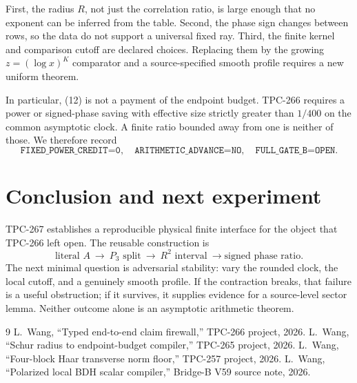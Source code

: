 \documentclass[11pt]{article}
\begin{document}
First, the radius \(R\), not just the correlation ratio, is large enough that
no exponent can be inferred from the table.  Second, the phase sign changes
between rows, so the data do not support a universal fixed ray.  Third, the
finite kernel and comparison cutoff are declared choices.  Replacing them by
the growing \(z=(\log x)^K\) comparator and a source-specified smooth profile
requires a new uniform theorem.

In particular, (12) is not a payment of the endpoint budget.  TPC-266
requires a power or signed-phase saving with effective size strictly greater
than \(1/400\) on the common asymptotic clock.  A finite ratio bounded away
from one is neither of those.  We therefore record
\[
 \texttt{FIXED\_POWER\_CREDIT=0},\quad
 \texttt{ARITHMETIC\_ADVANCE=NO},\quad
 \texttt{FULL\_GATE\_B=OPEN}.
\]

\section{Conclusion and next experiment}

TPC-267 establishes a reproducible physical finite interface for the object
that TPC-266 left open.  The reusable construction is
\[
 \text{literal }A\ \longrightarrow\ P_3\text{ split}\ \longrightarrow\
 R^2\text{ interval}\ \longrightarrow\text{signed phase ratio}.
\]
The next minimal question is adversarial stability: vary the rounded clock,
the local cutoff, and a genuinely smooth profile.  If the contraction breaks,
that failure is a useful obstruction; if it survives, it supplies evidence
for a source-level sector lemma.  Neither outcome alone is an asymptotic
arithmetic theorem.

\begin{thebibliography}{9}
L.~Wang, ``Typed end-to-end claim firewall,'' TPC-266 project, 2026.
\bibitem{tpc265}
L.~Wang, ``Schur radius to endpoint-budget compiler,'' TPC-265 project, 2026.
\bibitem{tpc257}
L.~Wang, ``Four-block Haar transverse norm floor,'' TPC-257 project, 2026.
\bibitem{v59}
L.~Wang, ``Polarized local BDH scalar compiler,'' Bridge-B V59 source note,
2026.
\end{thebibliography}
\end{document}
